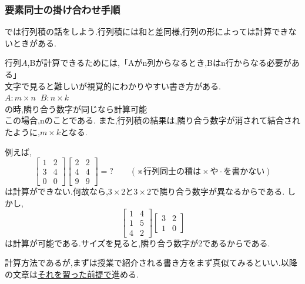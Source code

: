 \subsubsection{要素同士の掛け合わせ手順}
では行列積の話をしよう.行列積には和と差同様,行列の形によっては計算できないときがある.
\begin{tcolorbox}[colframe=black!80,colback=white,title=行列積の計算可能なサイズの組み合わせ]
行列$A$,Bが計算できるためには,「Aがn列からなるとき,Bはn行からなる必要がある」\\
文字で見ると難しいが視覚的にわかりやすい書き方がある.
\\$A:m\times n \; \; B:n\times k$\\ 
の時,隣り合う数字が同じなら計算可能\\
この場合,nのことである.
また,行列積の結果は,隣り合う数字が消されて結合されたように,$m\times k$となる.\\
\end{tcolorbox}
例えば,
\[
\begin{bmatrix}
    1 & 2 \\ 3 & 4 \\ 0 & 0
\end{bmatrix}
\begin{bmatrix}
    2 & 2 \\ 4 & 4 \\ 9 & 9
\end{bmatrix}=?\qquad(\text{※行列同士の積は}\times\text{や}\cdot\text{を書かない})
\]
は計算ができない.何故なら,$3\times2$と$3\times2$で隣り合う数字が異なるからである.
しかし,
\[
\begin{bmatrix}
    1 & 4 \\ 1 & 5 \\ 4 & 2
\end{bmatrix}
\begin{bmatrix}
    3 & 2 \\ 1 & 0
\end{bmatrix}
\]は計算が可能である.サイズを見ると,隣り合う数字が2であるからである.

計算方法であるが,まずは授業で紹介される書き方をまず真似てみるといい.以降の文章は\underline{それを習った前提で}進める.

